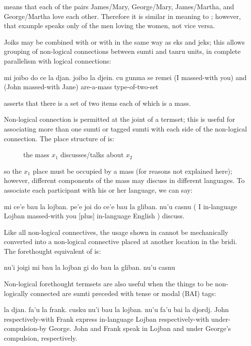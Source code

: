 {\noindent}means that each of the pairs James/Mary, George/Mary,
    James/Martha, and George/Martha love each other. Therefore it
    is similar in meaning to ;
    however, that example speaks only of the men loving the women,
    not vice versa. 

Joiks may be combined with  or with  in the same
    way as eks and jeks; this allows grouping of non-logical
    connections between sumti and tanru units, in complete
    parallelism with logical connections:
\begin{example}
mi joibo do ce la djan. joibo la djein.\n
\T	cu gunma se remei\n
(I massed-with you) and (John massed-with Jane)\n
\T	are-a-mass type-of-two-set
\end{example}

{\noindent}asserts that there is a set of two items each of which is a
    mass. 

Non-logical connection is permitted at the joint of a
    termset; this is useful for associating more than one sumti or
    tagged sumti with each side of the non-logical connection. The
    place structure of  is:
\begin{description}
\item[] the mass $x_1$ discusses/talks about $x_2$
\end{description}

so the $x_1$ place must be occupied by a mass (for reasons not
    explained here); however, different components of the mass may
    discuss in different languages. To associate each participant
    with his or her language, we can say:
\begin{example}
\T	mi ce'e bau la lojban.\n
\T	pe'e joi do ce'e bau la gliban. nu'u casnu\n
( I  in-language Lojban\n
\T	massed-with you [plus] in-language English ) discuss.
\end{example}

Like all non-logical connectives, the usage shown in  cannot be mechanically converted
    into a non-logical connective placed at another location in the
    bridi. The forethought equivalent of  is:
\begin{example}
\T	nu'i joigi mi bau la lojban\n
\T	gi do bau la gliban. nu'u casnu
\end{example}

Non-logical forethought termsets are also useful when the
    things to be non-logically connected are sumti preceded with
    tense or modal (BAI) tags:
\begin{example}
la djan. fa'u la frank. cusku\n
\T	nu'i bau la lojban.\n
\T	nu'u fa'u\n
\T	bai la djordj. \n
John respectively-with Frank express\n
{} in-language Lojban\n
\T	[joint] respectively-with\n
\T	under-compulsion-by George.\n
John and Frank speak in Lojban and under George's\n
\T	compulsion, respectively.
\end{example}


